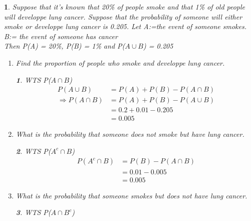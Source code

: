 \documentclass[11pt]{article}
\newtheorem*{solution}{\framebox{Sol}}
\newtheorem{example}{\framebox{Ex}}[section]
\begin{document}
            \begin{example}
                Suppose that it's known that 20\% of people smoke and that 1\% of old people will developpe lung cancer.
                Suppose that the probability of someone will either smoke or developpe lung cancer is 0.205.
                Let A:=the event of someone smokes. \\ B:= the event of someone has cancer
                \\Then P(A) = 20\%, P(B) = 1\% and P($A\cup B$) = 0.205
                \begin{enumerate}
                    \item Find the proportion of people who smoke and developpe lung cancer.    
                        \begin{solution}
                            WTS P($A\cap B$)
                            \begin{align*}
                                P(A\cup B) &= P(A) + P(B) -P(A\cap B) \tag{thm 5}\\ 
                                \Rightarrow P(A \cap B) &=P(A) + P(B) - P(A\cup B)\\
                                                        &=0.2+0.01-0.205\\
                                                        &=0.005
                            \end{align*}
                        \end{solution}
                    \item What is the probability that someone does not smoke but have lung cancer.
                        \begin{solution}
                            WTS P($A^c \cap B$)
                            \begin{align*}
                                P(A^c \cap B)   &= P(B) - P(A\cap B) \tag{thm 3}\\
                                                &=0.01 - 0.005\\
                                                &=0.005
                            \end{align*}
                        \end{solution}
                    \item What is the probability that someone smokes but does not have lung cancer.
                        \begin{solution}
                            WTS P($A\cap B^c$)

\end{solution}
\end{enumerate}
\end{example}
\end{document}
